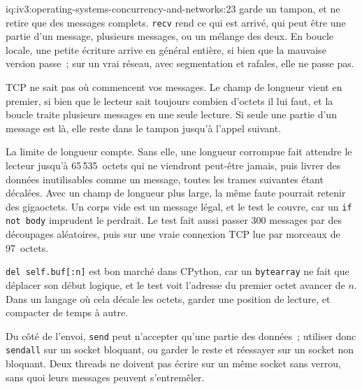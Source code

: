 \begin{solution}{iq:iv3:operating-systems-concurrency-and-networks:23}
 garde un tampon, et ne retire que des messages complets. \texttt{recv} rend ce qui est arrivé, qui peut être une partie d'un message, plusieurs messages, ou un mélange des deux. En boucle locale, une petite écriture arrive en général entière, si bien que la mauvaise version passe~; sur un vrai réseau, avec segmentation et rafales, elle ne passe pas.
\enlargethispage{-3\baselineskip}%
\label{lst:iv3:os:framing}

TCP ne sait pas où commencent vos messages. Le champ de longueur vient en premier, si bien que le lecteur sait toujours combien d'octets il lui faut, et la boucle traite plusieurs messages en une seule lecture. Si seule une partie d'un message est là, elle reste dans le tampon jusqu'à l'appel suivant.

La limite de longueur compte. Sans elle, une longueur corrompue fait attendre le lecteur jusqu'à 65\,535~octets qui ne viendront peut-être jamais, puis livrer des données inutilisables comme un message, toutes les trames suivantes étant décalées. Avec un champ de longueur plus large, la même faute pourrait retenir des gigaoctets. Un corps vide est un message légal, et le test le couvre, car un \texttt{if not body} imprudent le perdrait. Le test fait aussi passer 300 messages par des découpages aléatoires, puis sur une vraie connexion TCP lue par morceaux de 97~octets.

\texttt{del self.buf[:n]} est bon marché dans CPython, car un \texttt{bytearray} ne fait que déplacer son début logique, et le test voit l'adresse du premier octet avancer de $n$. Dans un langage où cela décale les octets, garder une position de lecture, et compacter de temps à autre.

Du côté de l'envoi, \texttt{send} peut n'accepter qu'une partie des données~; utiliser donc \texttt{sendall} sur un socket bloquant, ou garder le reste et réessayer sur un socket non bloquant. Deux threads ne doivent pas écrire sur un même socket sans verrou, sans quoi leurs messages peuvent s'entremêler.

\end{solution}

